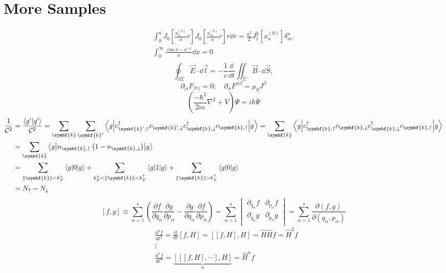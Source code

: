 \documentclass[11pt]{article}
\def\ee{\mathrm{e}}
\def\bm{\symbf}
\newcommand{\innerprod}[2]{\left\langle{#1}\middle\vert{#2}\right\rangle}
\newcommand{\brakket}[3]{\left\langle{#1}\middle\vert{#2}\middle\vert{#3}\right\rangle}
\begin{document}
\section{More Samples}

\begin{align*}
\int_{0}^aJ_0\left[\frac{x_n^{(0)}}{a}r\right]J_0\left[\frac{x_m^{(0)}}{a}r\right]r\dd{r}=\frac{a^2}{2}J_1^2[x_n^{(0)}]\delta_m^n.\\
\int_{0}^{\infty}\frac{\cos x-\ee^{-x}}{x}\dd{x}=0\\
\end{align*}
\[\oint_{\partial\Sigma}\vec E\cdot \dd{\vec{l}}=-\frac{1}{c}\frac{\dd}{\dd t}\iint_{\Sigma}\vec B \cdot \dd{\vec{S}};\]
\[\partial_{[a}F_{\beta\gamma]}=0;\quad \partial_\alpha F^{\alpha\beta}=\mu_0J^\beta\]
\[\left(\frac{-\hbar^2}{2m}\nabla^2+V\right)\Psi=i\hbar\dot{\Psi}\]
\[\begin{split}
\frac{1}{\mathcal{C}^2}&{}=\frac{\innerprod{g'}{g'}}{\mathcal{C}^2}=\sum_{\bm{k}}\sum_{\bm{k}'}\brakket{g}{c_{\bm{k}',\uparrow}^\dagger c_{\bm{k}',\downarrow} c_{\bm{k},\downarrow}^\dagger c_{\bm{k},\uparrow}}{g}=\sum_{\bm{k}}\brakket{g}{c_{\bm{k},\uparrow}^\dagger c_{\bm{k},\downarrow} c_{\bm{k},\downarrow}^\dagger c_{\bm{k},\uparrow}}{g}\\
&{}=\sum_{\bm{k}}\brakket{g}{n_{\bm{k},\uparrow}\left(1-n_{\bm{k},\downarrow}\right)}{g}\\
&{}=\sum_{\norm{\bm{k}}<k_F^\downarrow}\brakket{g}{0}{g}+\sum_{k_F^\downarrow<\norm{\bm{k}}<k_F^\uparrow}\brakket{g}{1}{g}+\sum_{\norm{\bm{k}}>k_F^\uparrow}\brakket{g}{0}{g}\\
&{}=N_\uparrow-N_\downarrow
\end{split}\]
\[\left[ f,g \right]\equiv \sum_{\alpha =1}^{s}{\left( \frac{\partial f}{\partial {{q}_{\alpha }}}\frac{\partial g}{\partial {{p}_{\alpha }}}-\frac{\partial g}{\partial {{q}_{\alpha }}}\frac{\partial f}{\partial {{p}_{\alpha }}} \right)}=\sum\limits_{\alpha =1}^{s}{\begin{vmatrix}
	\partial_{{q}_{\alpha }} f & \partial_{{p}_{\alpha }} f  \\
	\partial_{{q}_{\alpha }} g & \partial_{{p}_{\alpha }} g  \\
	\end{vmatrix} }=\sum\limits_{\alpha =1}^{s}{\frac{\partial \left( f,g \right)}{\partial \left( {{q}_{\alpha }},{{p}_{\alpha }} \right)}}\]
\[\begin{split}
& \frac{{{\text{d}}^{2}}f}{\text{d}{{t}^{2}}}=\frac{\text{d}}{\text{d}t}\left[ f,H \right]=\left[ \left[ f,H \right],H \right]=\hat{H}\hat{H}f={{{\hat{H}}}^{2}}f \\ 
& \vdots  \\ 
& \frac{{{\text{d}}^{n}}f}{\text{d}{{t}^{n}}}=\underbrace{\left[ \left[ \left[ f,H \right],\cdots  \right],H \right]}_{n}={{{\hat{H}}}^{n}}f  \\
\end{split}\]
\end{document}
